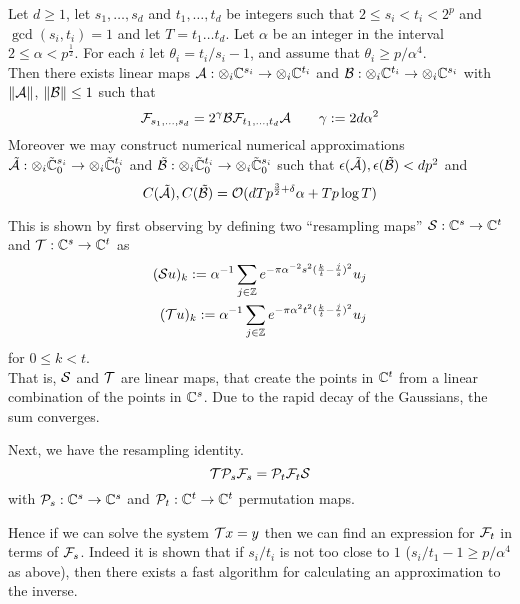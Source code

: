 \begin{theorem}
    Let $d \geq 1$, let $s_1, \ldots, s_d$ and $t_1, \ldots, t_d$ be integers such that $2 \leq s_i < t_i < 2^p$ and $\gcd(s_i, t_i) = 1$ and let $T = t_1\ldots t_d$. Let $\alpha$ be an integer in the interval $2 \leq \alpha < p^{\frac{1}{2}}$. For each $i$ let $\theta_i = t_i / s_i - 1$, and assume that $\theta_i \geq p/\alpha^4$.\\
    Then there exists linear maps $\mathcal A: \otimes_i {\mathbb C}^{s_i} \to \otimes_i {\mathbb C}^{t_i}$ and $\mathcal B: \otimes_i {\mathbb C}^{t_i} \to \otimes_i {\mathbb C}^{s_i}$ with $\|\mathcal A\|$, $\|\mathcal B\| \leq 1$ such that
    \[
        \mathcal F_{s_1, \ldots, s_d} = 2^\gamma \mathcal B \mathcal F_{t_1, \ldots, t_d} \mathcal A \qquad \gamma := 2d\alpha^2
    \]
    Moreover we may construct numerical numerical approximations $\tilde{\mathcal A}: \otimes_i \tilde{{\mathbb C}}^{s_i}_0 \to \otimes_i \tilde{{\mathbb C}}^{t_i}_0$ and $\tilde{\mathcal B}: \otimes_i \tilde{{\mathbb C}}^{t_i}_0 \to \otimes_i \tilde{{\mathbb C}}^{s_i}_0$  such that $\epsilon(\tilde{\mathcal A}), \epsilon(\tilde{\mathcal B}) < dp^2$ and
    \[
        C(\tilde{\mathcal A}), C(\tilde{\mathcal B}) = \mathcal O(dTp^{{\frac{3}{2}} + \delta}\alpha + Tp\log T)
    \]
\end{theorem}

\medskip

This is shown by first observing by defining two ``resampling maps'' $\mathcal S: {\mathbb C}^s \to {\mathbb C}^t$ and $\mathcal T: {\mathbb C}^s \to {\mathbb C}^t$ as
\begin{align*}
    (\mathcal Su)_k := \alpha^{-1} \sum_{j \in {\mathbb Z}} e^{-\pi \alpha^{-2}s^2 (\frac{k}{t} - \frac{j}{s})^2}u_j\\
    (\mathcal Tu)_k := \alpha^{-1} \sum_{j \in {\mathbb Z}} e^{-\pi \alpha^2 t^2 (\frac{k}{t} - \frac{j}{s})^2}u_j
\end{align*}
for $0 \leq k < t$.\\
That is, $\mathcal S$ and $\mathcal T$ are linear maps, that create the points in ${\mathbb C}^t$ from a linear combination of the points in ${\mathbb C}^s$. Due to the rapid decay of the Gaussians, the sum converges.

Next, we have the resampling identity.
\[
  \mathcal T\mathcal P_s\mathcal F_s = \mathcal P_t\mathcal F_t\mathcal S
\]
with $\mathcal P_s: {\mathbb C}^s \to {\mathbb C}^s$ and $\mathcal P_t: {\mathbb C}^t \to {\mathbb C}^t$ permutation maps.

Hence if we can solve the system $\mathcal Tx = y$ then we can find an expression for $\mathcal F_t$ in terms of $\mathcal F_s$. Indeed it is shown that if $s_i / t_i$ is not too close to $1$ ($s_i / t_1 - 1 \geq p/\alpha^4$ as above), then there exists a fast algorithm for calculating an approximation to the inverse.

